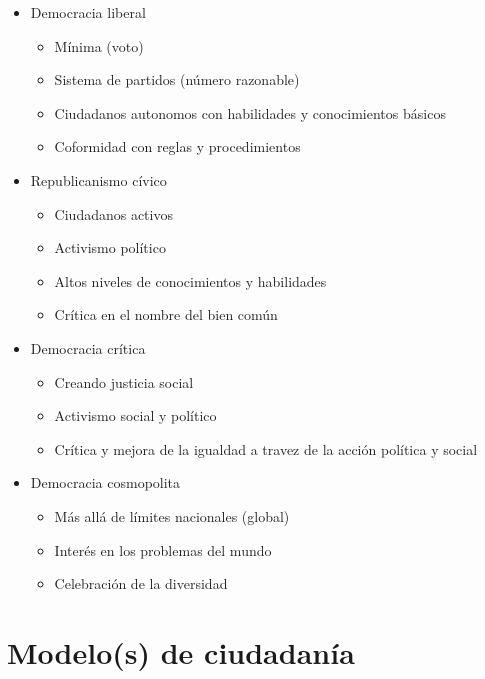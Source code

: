 \documentclass[]{beamer} %
\begin{document}
\begin{frame} [allowframebreaks]
	\begin{itemize}
		\item Democracia liberal
			\begin{itemize}
				\item Mínima (voto)
				\item Sistema de partidos (número razonable)
				\item Ciudadanos autonomos con habilidades y conocimientos básicos
				\item Coformidad con reglas y procedimientos
			\end{itemize}
		
		\item Republicanismo cívico
			\begin{itemize}
				\item Ciudadanos activos
				\item Activismo político
				\item Altos niveles de conocimientos y habilidades
				\item Crítica en el nombre del bien común
			\end{itemize}
			
	\framebreak
		\item Democracia crítica
			\begin{itemize}
				\item Creando justicia social
				\item Activismo social y político
				\item Crítica y mejora de la igualdad a travez de la acción política y social
			\end{itemize}
		
		\item Democracia cosmopolita 
			\begin{itemize}
				\item Más allá de límites nacionales (global)
				\item Interés en los problemas del mundo
				\item Celebración de la diversidad
			\end{itemize}
		
	
	\end{itemize}
\end{frame}

\section{Modelo(s) de ciudadanía}
\end{document}
